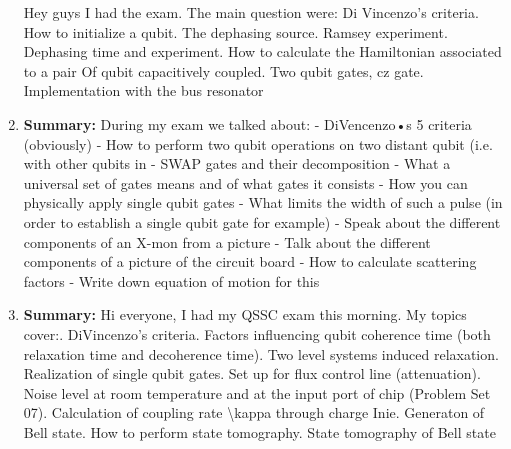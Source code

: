 \documentclass{article}%
\begin{document}
\begin{enumerate}
\begin{mycolorbox}
Hey guys I had the exam. The main question were:\newline%
Di Vincenzo's criteria. How to initialize a qubit. The dephasing source. Ramsey experiment. Dephasing time and experiment. How to calculate the Hamiltonian associated to a pair Of qubit capacitively coupled. Two qubit gates, cz gate. Implementation with the bus resonator%
\end{mycolorbox}%
\item%
\textbf{Summary:}%
\newline%
During my exam we talked about:\newline%
 {-} DiVencenzo•s 5 criteria (obviously)\newline%
 {-} How to perform two qubit operations on two distant qubit (i.e. with other qubits in\newline%
 {-} SWAP gates and their decomposition\newline%
 {-} What a universal set of gates means and of what gates it consists\newline%
 {-} How you can physically apply single qubit gates\newline%
 {-} What limits the width of such a pulse (in order to establish a single qubit gate for example)\newline%
 {-} Speak about the different components of an X{-}mon from a picture\newline%
 {-} Talk about the different components of a picture of the circuit board\newline%
 {-} How to calculate scattering factors\newline%
 {-} Write down equation of motion for this%
\item%
\begin{mycolorbox}%
\textbf{Summary:}%
\newline%
Hi everyone, I had my QSSC exam this morning. My topics cover:. DiVincenzo's criteria. Factors influencing qubit coherence time (both relaxation time and decoherence time). Two level systems induced relaxation. Realization of single qubit gates. Set up for flux control line (attenuation). Noise level at room temperature and at the input port of chip (Problem Set 07). Calculation of coupling rate \textbackslash{}kappa through charge Inie. Generaton of Bell state. How to perform state tomography. State tomography of Bell state%
\end{mycolorbox}%
\end{enumerate}%
\newpage%
\end{document}
